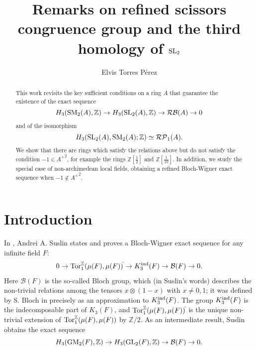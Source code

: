 \documentclass[11pt]{amsart}
\theoremstyle{definition}
\theoremstyle{plain}
\theoremstyle{definition}
\numberwithin{equation}{section}
\newcommand{\z}{\mathbb{Z}}
\newcommand{\C}{\mathbb{C}}
\newcommand{\BB}{\mathcal{B}}
\newcommand{\RP}{\mathcal{RP}}
\newcommand{\RB}{\mathcal{RB}}
\renewcommand{\aa}{{A^\times}}
\newcommand{\tors}{{{\rm Tor}_1^{\z}}}
\newcommand{\half}{{\left[\frac{1}{2}\right]}}
\newcommand{\mth}[1]{\left[ \frac{1}{#1} \right]}
\newcommand{\GL}{\mathit{{\rm GL}}}
\newcommand{\SL}{\mathit{{\rm SL}}}
\newcommand{\GM}{\mathit{{\rm GM}}}
\newcommand{\SM}{\mathit{{\rm SM}}}
\newcommand{\ind}{{\rm ind}}
\begin{document}
	\title{Remarks on refined scissors congruence group and the third homology of \texorpdfstring{$\SL_2$}{Lg}}
	\author{Elvis Torres P\'erez}
	\address{\sf 
		Department of Sciences, Pontifical Catholic University of Peru (PUCP), 
		Lima, Peru}
	
	\begin{abstract}
		This work revisits the key sufficient conditions on a ring $A$ that guarantee the existence of the exact sequence
		\[
		H_3(\SM_2(A),\z)\to H_3(\SL_2(A),\z)\to\RB(A)\to 0
		\]
		and of the isomorphism 
		\[
		H_3(\SL_2(A),\SM_2(A);\z)\simeq\RP_1(A).
		\]
		We show that there are rings which satisfy the relations above but do not satisfy the condition $-1\in\aa^2$, for example the rings $\z\half$ and $\z\mth{10}$. In addition, we study the special case of non-archimedean local fields, obtaining a refined Bloch-Wigner exact sequence when $-1\notin\aa^2$.
	\end{abstract}
	\maketitle
	\section{Introduction}
	In \cite{suslin1991}, Andrei A. Suslin states and proves a Bloch-Wigner exact sequence for any infinite field $F$: 
	\begin{equation}\label{sus-BW-seq}
		0\to\tors(\mu(F),\mu(F))^{\tilde{}}\to K^\ind_3(F)\to \BB(F)\to 0.    
	\end{equation}
	Here $\BB(F)$ is the so-called Bloch group, which (in Suslin's words) describes the non-trivial relations among the tensors $x\otimes(1-x)$ with $x\neq 0,1$; it was defined by S. Bloch in \cite{bloch2000} precisely as an approximation to $K_3^\ind(F)$. The group $K^\ind_3(F)$ is the indecomposable part of $K_3(F)$, and $\tors(\mu(F),\mu(F))^{\tilde{}}$ is the unique non-trivial extension of $\tors(\mu(F),\mu(F))$ by $\z/2$. As an intermediate result, Suslin obtains the exact sequence
	\begin{equation}\label{gm2-gl2-seq}
		H_3(\GM_2(F),\z)\to H_3(\GL_2(F),\z)\to \BB(F)\to 0.    
	\end{equation}
	
\end{document}
